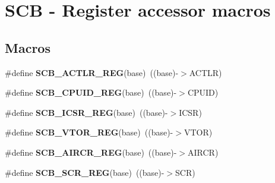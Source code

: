 \hypertarget{group___s_c_b___register___accessor___macros}{}\section{S\+CB -\/ Register accessor macros}
\label{group___s_c_b___register___accessor___macros}
\subsection*{Macros}
\begin{DoxyCompactItemize}
\item 
\mbox{\label{group___s_c_b___register___accessor___macros_ga8e6ef559a6b8231b4f86185221c7f82a}} 
\#define {\bfseries S\+C\+B\+\_\+\+A\+C\+T\+L\+R\+\_\+\+R\+EG}(base)~((base)-\/$>$A\+C\+T\+LR)
\item 
\mbox{\label{group___s_c_b___register___accessor___macros_ga117081636e39f490ee0d6c2dd71994c3}} 
\#define {\bfseries S\+C\+B\+\_\+\+C\+P\+U\+I\+D\+\_\+\+R\+EG}(base)~((base)-\/$>$C\+P\+U\+ID)
\item 
\mbox{\label{group___s_c_b___register___accessor___macros_gad49675a96aa05153fe6157c5c12667b9}} 
\#define {\bfseries S\+C\+B\+\_\+\+I\+C\+S\+R\+\_\+\+R\+EG}(base)~((base)-\/$>$I\+C\+SR)
\item 
\mbox{\label{group___s_c_b___register___accessor___macros_ga5f6385eaf8fd7164c6c3c225b6a7d3f4}} 
\#define {\bfseries S\+C\+B\+\_\+\+V\+T\+O\+R\+\_\+\+R\+EG}(base)~((base)-\/$>$V\+T\+OR)
\item 
\mbox{\label{group___s_c_b___register___accessor___macros_ga128fc0df59d5e2b7fc55a6ded49b1586}} 
\#define {\bfseries S\+C\+B\+\_\+\+A\+I\+R\+C\+R\+\_\+\+R\+EG}(base)~((base)-\/$>$A\+I\+R\+CR)
\item 
\mbox{\label{group___s_c_b___register___accessor___macros_gaed0c82840ade63a78c5d42790e8d9270}} 
\#define {\bfseries S\+C\+B\+\_\+\+S\+C\+R\+\_\+\+R\+EG}(base)~((base)-\/$>$S\+CR)

\end{DoxyCompactItemize}
